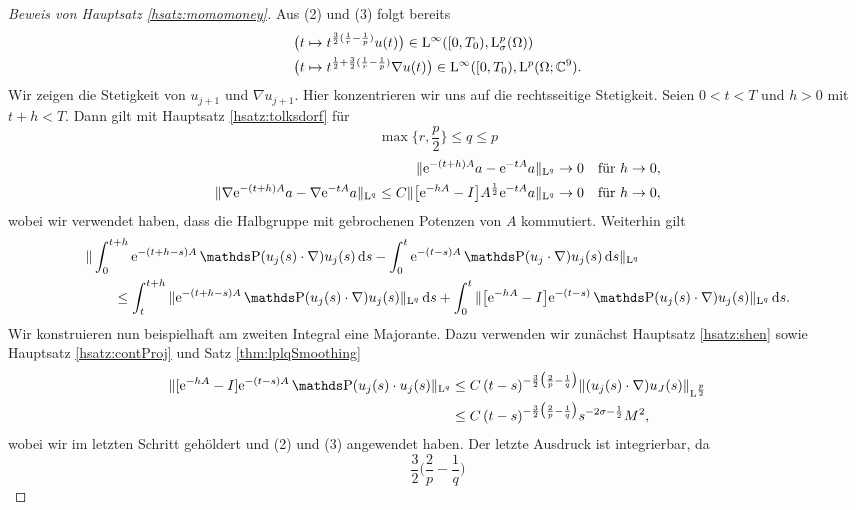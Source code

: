 \begin{proof}[Beweis von Hauptsatz \ref{hsatz:momomoney}]
  Aus (2) und (3) folgt bereits
  \begin{align*}
    &\big( t \mapsto t^{\frac{3}{2}(\frac{1}{r} - \frac{1}{p})} u(t) \big) \in \mathrm{L}^\infty([0,T_0), \mathrm{L}^p_\sigma(\Omega)) \\
    &\big( t \mapsto t^{\frac{1}{2} + \frac{3}{2}(\frac{1}{r} - \frac{1}{p})} \nabla u(t) \big) \in \mathrm{L}^\infty([0,T_0), \mathrm{L}^p(\Omega; \mathbb{C}^9) .
  \end{align*}
  Wir zeigen die Stetigkeit von $u_{j + 1}$ und $\nabla u_{j + 1}$.
  Hier konzentrieren wir uns auf die rechtsseitige Stetigkeit.
  Seien $0 < t < T$ und $h > 0$ mit $t + h < T$.
  Dann gilt mit Hauptsatz \ref{hsatz:tolksdorf} für
  $$
  \max\{r, \frac{p}{2} \} \leq q \leq p
  $$
  \begin{align*}
    \|\mathrm{e}^{-(t + h)A} a - \mathrm{e}^{-t A} a \|_{\mathrm{L}^q} \to 0 &\quad\text{für } h \to 0, \\
    \|\nabla\mathrm{e}^{-(t + h)A} a - \nabla \mathrm{e}^{-tA} a \|_{\mathrm{L}^q} \leq C\| \big[ \mathrm{e}^{-hA} - I \big] A^{\frac{1}{2}} \mathrm{e}^{-tA} a \|_{\mathrm{L}^q} \to 0 &\quad\text{für } h \to 0,
  \end{align*}
  wobei wir verwendet haben, dass die Halbgruppe mit gebrochenen Potenzen von $A$ kommutiert.
  Weiterhin gilt
  \begin{align*}
    &\| \int_0^{t + h} \e^{-(t + h - s) A} \PP(u_j(s) \cdot \nabla) u_j(s) \d s - \int_0^t \e^{-(t - s)A} \PP(u_j \cdot \nabla) u_j(s) \d s \|_{\Ell^q} \\
    &\qquad\leq \int_t^{t + h} \|\e^{-(t + h - s)A} \PP(u_j(s) \cdot \nabla) u_j(s) \|_{\Ell^q} \d s + \int_0^t \| \big[ \e^{-hA} - I \big] \e^{-(t - s)} \PP(u_j(s) \cdot \nabla) u_j(s) \|_{\Ell^q} \d s.
  \end{align*}
  Wir konstruieren nun beispielhaft am zweiten Integral eine Majorante.
  Dazu verwenden wir zunächst Hauptsatz \ref{hsatz:shen} sowie Hauptsatz \ref{hsatz:contProj} und Satz \ref{thm:lplqSmoothing}
  \begin{align*}
    \|[ \e^{-hA} - I] \e^{-(t - s)A} \PP(u_j(s) \cdot u_j(s) \|_{\Ell^q} 
    &\leq C \, (t - s)^{-\frac{3}{2} \big( \frac{2}{p} - \frac{1}{q} \big)} \|(u_j(s) \cdot \nabla) u_J(s) \|_{\Ell^{\frac{p}{2}}} \\
    &\leq C\, (t - s)^{-\frac{3}{2} \big( \frac{2}{p} - \frac{1}{q} \big)} s^{-2\sigma - \frac{1}{2}} M^2,
  \end{align*}
  wobei wir im letzten Schritt gehöldert und (2) und (3) angewendet haben.
  Der letzte Ausdruck ist integrierbar, da
  $$
  \frac{3}{2} \big( \frac{2}{p} - \frac{1}{q} \big)
$$
\end{proof}
